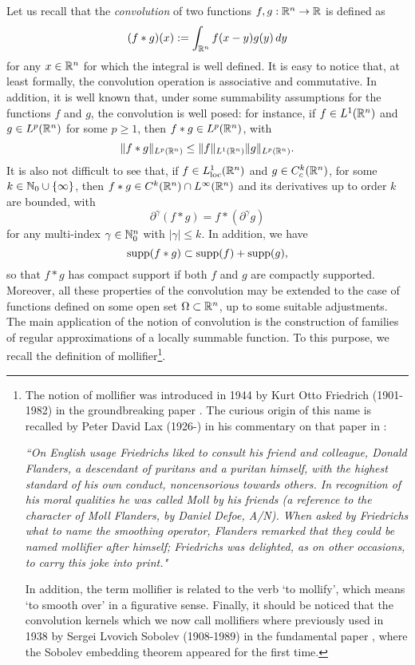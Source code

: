 Let us recall that the {\em convolution} of two functions $f, g : \mathbb{R}^{n} \to \mathbb{R}$ is defined as 
\begin{equation*}
(f \ast g)(x) := \int_{\mathbb{R}^{n}} f(x - y) g(y) \, dy
\end{equation*}
for any $x \in \mathbb{R}^{n}$ for which the integral is well defined. It is easy to notice that, at least formally, the convolution operation is associative and commutative. In addition, it is well known that, under some summability assumptions for the functions $f$ and $g$, the convolution is well posed: for instance, if $f \in L^{1}(\mathbb{R}^{n})$ and $g \in L^{p}(\mathbb{R}^n)$ for some $p \ge 1$, then $f \ast g \in L^{p}(\mathbb{R}^{n})$, with $$\|f \ast g\|_{L^{p}(\mathbb{R}^{n})} \le \|f\|_{L^{1}(\mathbb{R}^{n})}\|g\|_{L^{p}(\mathbb{R}^{n})}.$$ 
It is also not difficult to see that, if $f \in L^{1}_{\rm loc}(\mathbb{R}^{n})$ and $g \in C_{c}^{k}(\mathbb{R}^{n})$, for some $k \in \mathbb{N}_{0} \cup \{\infty\}$, then $f\ast g \in C^{k}(\mathbb{R}^{n}) \cap L^{\infty}(\mathbb{R}^{n})$ and its derivatives up to order $k$ are bounded, with
\begin{equation*}
\partial^{\gamma} (f \ast g) = f \ast (\partial^{\gamma} g)
\end{equation*}
for any multi-index $\gamma \in \mathbb{N}_{0}^{n}$ with $|\gamma|\le k$. In addition, we have
\begin{equation*}
\operatorname{supp}(f \ast g) \subset \operatorname{supp}(f) + \operatorname{supp}(g),
\end{equation*}
so that $f \ast g$ has compact support if both $f$ and $g$ are compactly supported. Moreover, all these properties of the convolution may be extended to the case of functions defined on some open set $\Omega \subset \mathbb{R}^{n}$, up to some suitable adjustments. 
The main application of the notion of convolution is the construction of families of regular approximations of a locally summable function. To this purpose, we recall the definition of mollifier\footnote{The notion of mollifier was introduced in 1944 by Kurt Otto Friedrich (1901-1982) in the groundbreaking paper \cite{MR9701}. The curious origin of this name is recalled by Peter David Lax (1926-) in his commentary on that paper in  \cite{MR897749}: 

{\em ``On English usage Friedrichs liked to consult his friend and colleague, Donald Flanders, a descendant of puritans and a puritan himself, with the highest standard of his own conduct, noncensorious towards others. In recognition of his moral qualities he was called Moll by his friends {\rm (a reference to the character of Moll Flanders, by Daniel Defoe, A/N)}. When asked by Friedrichs what to name the smoothing operator, Flanders remarked that they could be named mollifier after himself; Friedrichs was delighted, as on other occasions, to carry this joke into print."}

In addition, the term mollifier is related to the verb `to mollify', which means `to smooth over' in a figurative sense. Finally, it should be noticed that the convolution kernels which we now call mollifiers where previously used in 1938 by Sergei Lvovich Sobolev (1908-1989) in the fundamental paper \cite{soboleff1938theoreme}, where the Sobolev embedding theorem appeared for the first time.}.

